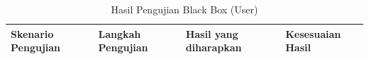 \begin{longtable}{|p{3.8cm}|p{4.5cm}|p{4.5cm}|p{2cm}|}
    \caption{Hasil Pengujian Black Box (User)} \label{tabel:hasil_bb_user}                                                                                                                                                                                                                                                                                                                                                                                                                                                                                                   \\
    \hline
    \textbf{Skenario Pengujian}                                                & \textbf{Langkah Pengujian}                                                                                                                                                                                                                                                                                        & \textbf{Hasil yang diharapkan}                                                                                                              & \textbf{Kesesuaian Hasil} \\
    \hline
    \endfirsthead



\end{longtable}
